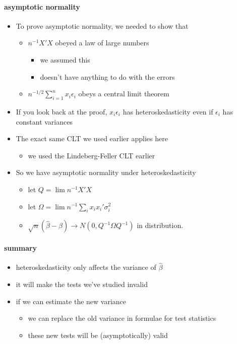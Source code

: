 \paragraph{asymptotic normality}
\label{sec-1-1-6}

\begin{itemize}
\item To prove asymptotic normality, we needed to show that
\begin{itemize}
\item $n^{-1} X'X$ obeyed a law of large numbers
\begin{itemize}
\item we assumed this
\item doesn't have anything to do with the errors
\end{itemize}
\item $n^{-1/2} \sum_{i=1}^n x_i \epsilon_i$ obeys a central limit
          theorem
\end{itemize}
\item If you look back at the proof, $x_i \epsilon_i$ has
        heteroskedasticity even if $\epsilon_i$ has constant variances
\item The exact same CLT we used earlier applies here
\begin{itemize}
\item we used the Lindeberg-Feller CLT earlier
\end{itemize}
\item So we have asymptotic normality under heteroskedasticity
\begin{itemize}
\item let $Q = \lim n^{-1} X'X$
\item let $\Omega = \lim n^{-1} \sum_i x_i x_i' \sigma_i^2$
\item $\sqrt{n}(\hat\beta - \beta) \to N(0, Q^{-1} \Omega Q^{-1})$ in
          distribution.
\end{itemize}
\end{itemize}
\paragraph{summary}
\label{sec-1-1-7}

\begin{itemize}
\item heteroskedasticity only affects the variance of $\hat\beta$
\item it will make the tests we've studied invalid
\item if we can estimate the new variance
\begin{itemize}
\item we can replace the old variance in formulae for test statistics
\item these new tests will be (asymptotically) valid
\end{itemize}
\end{itemize}

